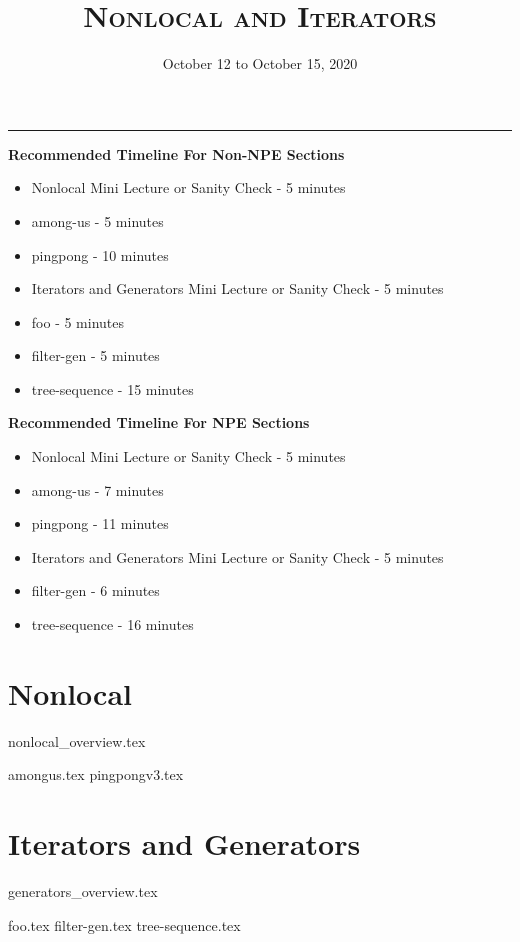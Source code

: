 \documentclass{exam}
\title{\textsc{Nonlocal and Iterators}}
\date{October 12 to October 15, 2020}
\begin{document}
\maketitle
\rule{\textwidth}{0.15em}
\fontsize{12}{15}\selectfont

\begin{guide}
\textbf{Recommended Timeline For Non-NPE Sections}
\begin{itemize}
    \item Nonlocal Mini Lecture or Sanity Check - 5 minutes
    \item among-us - 5 minutes
    \item pingpong - 10 minutes
    \item Iterators and Generators Mini Lecture or Sanity Check - 5 minutes
    \item foo - 5 minutes
    \item filter-gen - 5 minutes
    \item tree-sequence - 15 minutes
\end{itemize}
\textbf{Recommended Timeline For NPE Sections}
\begin{itemize}
    \item Nonlocal Mini Lecture or Sanity Check - 5 minutes
    \item among-us - 7 minutes
    \item pingpong - 11 minutes
    \item Iterators and Generators Mini Lecture or Sanity Check - 5 minutes
    \item filter-gen - 6 minutes
    \item tree-sequence - 16 minutes
\end{itemize}
\end{guide}

\section{Nonlocal}
{nonlocal_overview.tex}
\begin{questions}
{amongus.tex}
{pingpongv3.tex}
\end{questions}

\newpage
\section{Iterators and Generators}
{generators_overview.tex}
\begin{questions}
{foo.tex}
{filter-gen.tex}
{tree-sequence.tex}
\end{questions}
\end{document}
